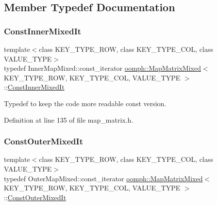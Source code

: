 \subsection{Member Typedef Documentation}
\mbox{\label{classoomph_1_1MapMatrixMixed_a0599160ea5bf25e9666f6825af3ed480}} 
\subsubsection{\texorpdfstring{Const\+Inner\+Mixed\+It}{ConstInnerMixedIt}}
{\footnotesize\ttfamily template$<$class K\+E\+Y\+\_\+\+T\+Y\+P\+E\+\_\+\+R\+OW, class K\+E\+Y\+\_\+\+T\+Y\+P\+E\+\_\+\+C\+OL, class V\+A\+L\+U\+E\+\_\+\+T\+Y\+PE$>$ \\
typedef Inner\+Map\+Mixed\+::const\+\_\+iterator \hyperlink{classoomph_1_1MapMatrixMixed}{oomph\+::\+Map\+Matrix\+Mixed}$<$ K\+E\+Y\+\_\+\+T\+Y\+P\+E\+\_\+\+R\+OW, K\+E\+Y\+\_\+\+T\+Y\+P\+E\+\_\+\+C\+OL, V\+A\+L\+U\+E\+\_\+\+T\+Y\+PE $>$\+::\hyperlink{classoomph_1_1MapMatrixMixed_a0599160ea5bf25e9666f6825af3ed480}{Const\+Inner\+Mixed\+It}}



Typedef to keep the code more readable const version. 



Definition at line 135 of file map\+\_\+matrix.\+h.

\mbox{\label{classoomph_1_1MapMatrixMixed_aae407586fb40aaf48fd20a0678adb591}} 
\subsubsection{\texorpdfstring{Const\+Outer\+Mixed\+It}{ConstOuterMixedIt}}
{\footnotesize\ttfamily template$<$class K\+E\+Y\+\_\+\+T\+Y\+P\+E\+\_\+\+R\+OW, class K\+E\+Y\+\_\+\+T\+Y\+P\+E\+\_\+\+C\+OL, class V\+A\+L\+U\+E\+\_\+\+T\+Y\+PE$>$ \\
typedef Outer\+Map\+Mixed\+::const\+\_\+iterator \hyperlink{classoomph_1_1MapMatrixMixed}{oomph\+::\+Map\+Matrix\+Mixed}$<$ K\+E\+Y\+\_\+\+T\+Y\+P\+E\+\_\+\+R\+OW, K\+E\+Y\+\_\+\+T\+Y\+P\+E\+\_\+\+C\+OL, V\+A\+L\+U\+E\+\_\+\+T\+Y\+PE $>$\+::\hyperlink{classoomph_1_1MapMatrixMixed_aae407586fb40aaf48fd20a0678adb591}{Const\+Outer\+Mixed\+It}}




